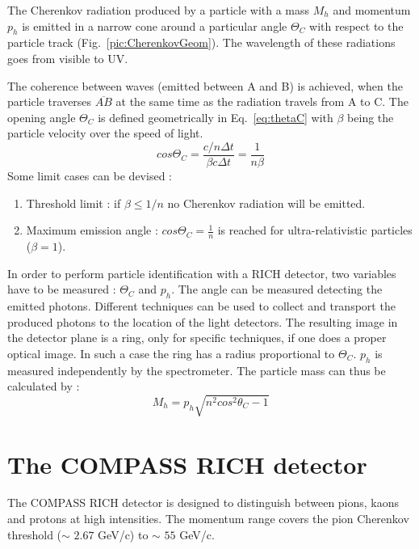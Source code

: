 The Cherenkov radiation produced by a particle with a mass $M_h$ and momentum $p_h$ is emitted in a narrow cone around a particular angle $\Theta_C$ with respect to the particle track (Fig.~\ref{pic:CherenkovGeom}). The wavelength of these radiations goes from visible to UV.

The coherence between waves (emitted between A and B) is achieved, when the particle traverses $\overline{AB}$ at the same time as the radiation travels from A to C. The opening angle $\Theta_C$ is defined geometrically in Eq.~\ref{eq:thetaC} with $\beta$ being the particle velocity over the speed of light.
%
\begin{equation}
  cos\Theta_C = \frac{c/n \Delta t}{\beta c \Delta t} = \frac{1}{n\beta}
  \label{eq:thetaC}
\end{equation}
%
Some limit cases can be devised :
\begin{enumerate}
  \item Threshold limit : if $\beta \leq 1/n$ no Cherenkov radiation will be emitted.
  \item Maximum emission angle : $cos \Theta_C = \frac{1}{n}$ is reached for ultra-relativistic particles ($\beta = 1$).
\end{enumerate}

In order to perform particle identification with a RICH detector, two variables have to be measured : $\Theta_C$ and $p_h$. The angle can be measured detecting the emitted photons. Different techniques can be used to collect and transport the produced photons to the location of the light detectors. The resulting image in the detector plane is a ring, only for specific techniques, if one does a proper optical image. In such a case the ring has a radius proportional to $\Theta_C$. $p_h$ is measured independently by the spectrometer. The particle mass can thus be calculated by :
%
\begin{equation}
  M_h = p_h \sqrt{n^2 cos^2 \theta_C -1}
\end{equation}


\section{The COMPASS RICH detector}

The COMPASS RICH detector is designed to distinguish between pions, kaons and protons at high intensities. The momentum range covers the pion Cherenkov threshold ($\sim$ $2.67$ GeV/c) to $\sim$ $55$ GeV/c.


